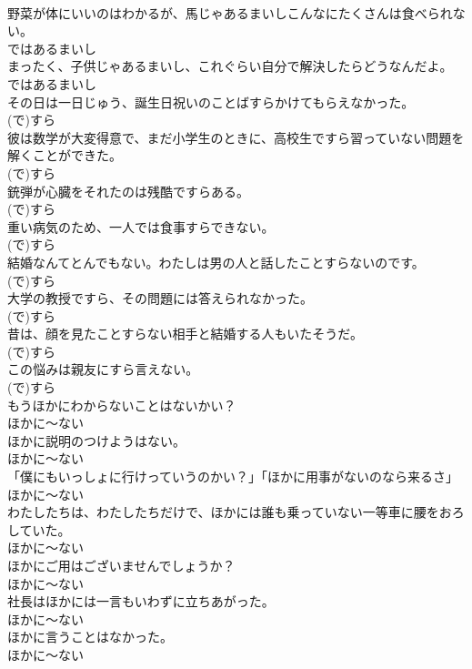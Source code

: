 \documentclass[8pt]{extreport}
\begin{document}
\begin{CJK}{UTF8}{min}
\\	野菜が体にいいのはわかるが、馬じゃあるまいしこんなにたくさんは食べられない。	
\\	ではあるまいし	
\\	まったく、子供じゃあるまいし、これぐらい自分で解決したらどうなんだよ。	
\\	ではあるまいし	
\\	その日は一日じゅう、誕生日祝いのことばすらかけてもらえなかった。	
\\	(で)すら	
\\	彼は数学が大変得意で、まだ小学生のときに、高校生ですら習っていない問題を解くことができた。	
\\	(で)すら	
\\	銃弾が心臓をそれたのは残酷ですらある。	
\\	(で)すら	
\\	重い病気のため、一人では食事すらできない。	
\\	(で)すら	
\\	結婚なんてとんでもない。わたしは男の人と話したことすらないのです。	
\\	(で)すら	
\\	大学の教授ですら、その問題には答えられなかった。	
\\	(で)すら	
\\	昔は、顔を見たことすらない相手と結婚する人もいたそうだ。	
\\	(で)すら	
\\	この悩みは親友にすら言えない。	
\\	(で)すら	
\\	もうほかにわからないことはないかい？	
\\	ほかに～ない	
\\	ほかに説明のつけようはない。	
\\	ほかに～ない	
\\	「僕にもいっしょに行けっていうのかい？」「ほかに用事がないのなら来るさ」	
\\	ほかに～ない	
\\	わたしたちは、わたしたちだけで、ほかには誰も乗っていない一等車に腰をおろしていた。	
\\	ほかに～ない	
\\	ほかにご用はございませんでしょうか？	
\\	ほかに～ない	
\\	社長はほかには一言もいわずに立ちあがった。	
\\	ほかに～ない	
\\	ほかに言うことはなかった。	
\\	ほかに～ない	

\end{CJK}
\end{document}
